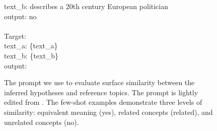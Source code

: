 \begin{figure*}[!htb]
\begin{tcolorbox}[colback=blue!5!white, colframe=blue!75!black, boxrule=0.5mm, arc=4mm, boxsep=5pt, width=\textwidth]
text\_b: describes a 20th century European politician \\
output: no \\
\\
Target: \\
text\_a: \{text\_a\} \\
text\_b: \{text\_b\} \\
output:
\end{tcolorbox}
\caption{The prompt we use to evaluate surface similarity between the inferred hypotheses and reference topics. The prompt is lightly edited from \citet{zhong_explaining_2024}.
The few-shot examples demonstrate three levels of similarity: equivalent meaning (yes), related concepts (related), and unrelated concepts (no).}
\label{fig:surface_similarity_prompt}
\end{figure*}
